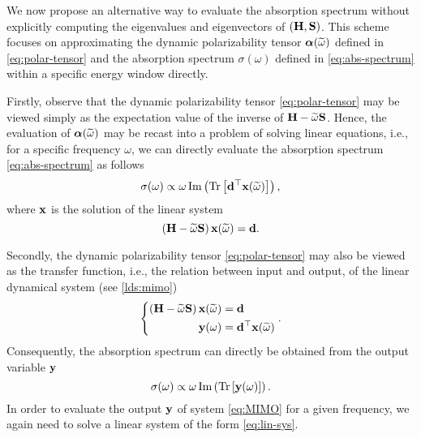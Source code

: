 We now propose an alternative way to evaluate the absorption spectrum without explicitly computing the eigenvalues and eigenvectors of $(\mathbf{H},\mathbf{S})$. This scheme focuses on approximating the dynamic polarizability tensor $\boldsymbol{\alpha}(\widetilde{\omega})$ defined in \eqref{eq:polar-tensor} and the absorption spectrum $\sigma(\omega)$ defined in \eqref{eq:abs-spectrum} within a specific energy window directly.

Firstly, observe that the dynamic polarizability tensor \eqref{eq:polar-tensor} may be viewed simply as the expectation value of the inverse of $\mathbf{H} -\widetilde{\omega} \mathbf{S}$. Hence, the evaluation of $\boldsymbol{\alpha}(\widetilde{\omega})$ may be recast into a problem of solving linear equations, i.e., for a specific frequency $\omega$, we can directly evaluate the absorption spectrum \eqref{eq:abs-spectrum} as follows
\begin{equation}
  \sigma(\omega) \propto \omega \operatorname{Im}\left(\operatorname{Tr}\left[ \mathbf{d}^\top \mathbf{x}(\widetilde{\omega}) \right]\right),
\end{equation}
where $\mathbf{x}$ is the solution of the linear system
\begin{equation}
  \left( \mathbf{H} - \widetilde{\omega}\mathbf{S} \right) \mathbf{x}(\widetilde{\omega}) = \mathbf{d}.
  \label{eq:lin-sys}
\end{equation}

Secondly, the dynamic polarizability tensor \eqref{eq:polar-tensor} may also be viewed as the transfer function, i.e., the relation between input and output, of the linear dynamical system (see \cref{lds:mimo})
\begin{equation}
  \left\{\begin{aligned}
    \left( \mathbf{H} - \widetilde{\omega}\mathbf{S} \right) \mathbf{x}(\widetilde{\omega}) &= \mathbf{d} \\
                                     \mathbf{y}(\omega) &= \mathbf{d}^\top \mathbf{x}(\widetilde{\omega})
  \end{aligned}\right..
  \label{eq:MIMO}
\end{equation}
Consequently, the absorption spectrum can directly be obtained from the output variable $\mathbf{y}$
\begin{equation}
  \sigma(\omega) \propto \omega \operatorname{Im}\left(\operatorname{Tr}\left[ \mathbf{y}(\omega) \right]\right).
\end{equation}
In order to evaluate the output $\mathbf{y}$ of system \eqref{eq:MIMO} for a given frequency, we again need to solve a linear system of the form \eqref{eq:lin-sys}.

